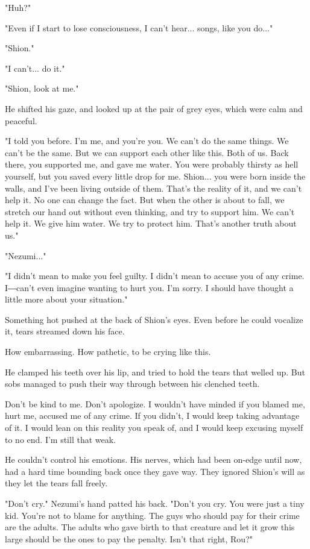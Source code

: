 "Huh?"

"Even if I start to lose consciousness, I can't hear... songs, like you
do..."

"Shion."

"I can't... do it."

"Shion, look at me."

He shifted his gaze, and looked up at the pair of grey eyes, which were
calm and peaceful.

"I told you before. I'm me, and you're you. We can't do the same things.
We can't be the same. But we can support each other like this. Both of
us. Back there, you supported me, and gave me water. You were probably
thirsty as hell yourself, but you saved every little drop for me.
Shion... you were born inside the walls, and I've been living outside of
them. That's the reality of it, and we can't help it. No one can change
the fact. But when the other is about to fall, we stretch our hand out
without even thinking, and try to support him. We can't help it. We give
him water. We try to protect him. That's another truth about us."

"Nezumi..."

"I didn't mean to make you feel guilty. I didn't mean to accuse you of
any crime. I―can't even imagine wanting to hurt you. I'm sorry. I should
have thought a little more about your situation."

Something hot pushed at the back of Shion's eyes. Even before he could
vocalize it, tears streamed down his face.

How embarrassing. How pathetic, to be crying like this.

He clamped his teeth over his lip, and tried to hold the tears that
welled up. But sobs managed to push their way through between his
clenched teeth.

Don't be kind to me. Don't apologize. I wouldn't have minded if you
blamed me, hurt me, accused me of any crime. If you didn't, I would keep
taking advantage of it. I would lean on this reality you speak of, and I
would keep excusing myself to no end. I'm still that weak.

He couldn't control his emotions. His nerves, which had been on-edge
until now, had a hard time bounding back once they gave way. They
ignored Shion's will as they let the tears fall freely.

"Don't cry." Nezumi's hand patted his back. "Don't you cry. You were
just a tiny kid. You're not to blame for anything. The guys who should
pay for their crime are the adults. The adults who gave birth to that
creature and let it grow this large should be the ones to pay the
penalty. Isn't that right, Rou?"

